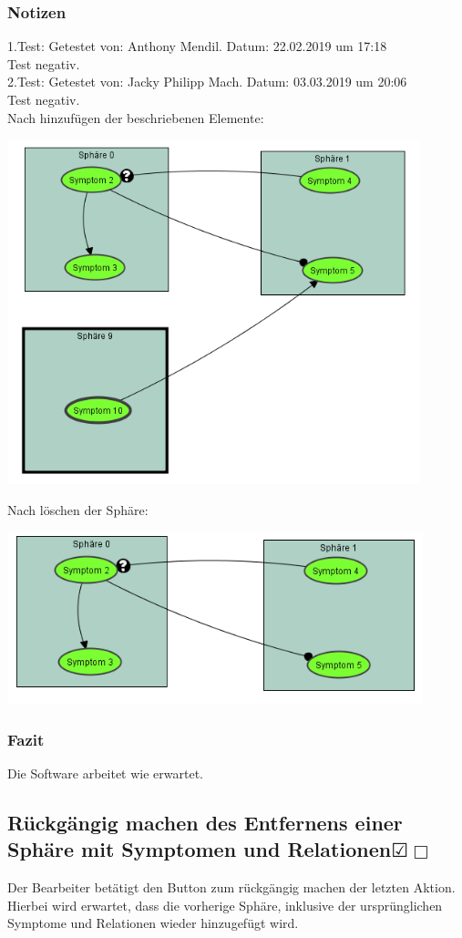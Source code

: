 \documentclass[enabledeprecatedfontcommands]{scrartcl}
\newcommand{\subsectiont}[2]{\subsection[#1]{#1{\normalsize\normalfont #2}}}
\newcommand{\leer}{$\Box$}
\newcommand{\ok}{$\CheckedBox$}
\begin{document}
\subsubsection{Notizen}
1.Test: Getestet von: Anthony Mendil. Datum: 22.02.2019 um 17:18 \\
Test negativ. \\
2.Test: Getestet von: Jacky Philipp Mach. Datum: 03.03.2019 um 20:06 \\
Test negativ. \\
Nach hinzufügen der beschriebenen Elemente: 
\begin{center}
\includegraphics[height=10cm]{2_10vorher.PNG}
\end{center}
Nach löschen der Sphäre: 
\begin{center}
\includegraphics[height=5cm]{2_10nachher.PNG}
\end{center}
\subsubsection{Fazit}
Die Software arbeitet wie erwartet. 

\subsectiont{Rückgängig machen des Entfernens einer Sphäre mit Symptomen und Relationen}{\dotfill\XBox\ok\leer}
Der Bearbeiter betätigt den Button zum rückgängig machen der letzten Aktion. Hierbei wird erwartet, dass die vorherige Sphäre, inklusive der ursprünglichen Symptome und Relationen wieder hinzugefügt wird. 
\end{document}
